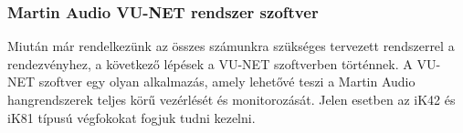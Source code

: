 \subsubsection{Martin Audio VU-NET rendszer szoftver \cite{VUNETUSERGUIDE}}
Miután már rendelkezünk az összes számunkra szükséges tervezett rendszerrel a rendezvényhez, a következő lépések a VU-NET szoftverben történnek.
A VU-NET szoftver egy olyan alkalmazás, amely lehetővé teszi a Martin Audio hangrendszerek teljes körű vezérlését és monitorozását.
Jelen esetben az iK42 és iK81 típusú végfokokat fogjuk tudni kezelni. 











